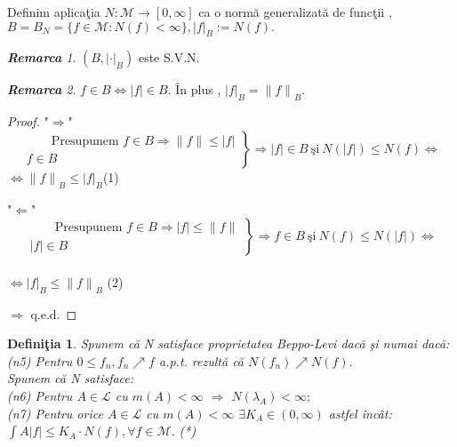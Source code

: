 \documentclass[ a4paper, 12pt]{report}
\newtheorem{definition}{\bf Defini\c tia}[section]
\theoremstyle{remark}
\newtheorem{remarc}{\bf Remarca}[section]
\numberwithin{equation}{section}
\begin{document}
Definim aplica\c tia $N : \mathcal{M} \rightarrow [0,\infty]$ ca o norm\u a generalizat\u a de func\c tii ,\\ $B=B_N=\{f \in \mathcal{M} : N(f) < \infty\} , {\lvert f \rvert}_B := N(f).$
\begin{remarc}
$(B,{\lvert \cdot \rvert}_B)$ este S.V.N.
\end{remarc}
\begin{remarc}
$f \in B \Leftrightarrow \lvert f \rvert \in B.$ \^In plus , ${\lvert f \rvert}_B = {\lVert f \rVert}_B.$
\end{remarc}
\begin{proof}
"$\Rightarrow$"
\begin{equation*}
\left.\begin{aligned}
          \qquad\text{Presupunem $f \in B$} \Rightarrow {\lVert f \rVert} \leq \lvert f \rvert\\
         f \in B
       \end{aligned}
\right\}
\Rightarrow \lvert f \rvert \in B \ \mbox{\c si}\  N(\lvert f \rvert) \leq N(f) \Leftrightarrow
\end{equation*}
$\Leftrightarrow {\lVert f \rVert}_B \leq {\lvert f \rvert}_B$\hspace{2mm}(1)

"$\Leftarrow$"
\begin{equation*}
\left.\begin{aligned}
          \qquad\text{Presupunem $f \in B$} \Rightarrow {\lvert f \rvert} \leq \lVert f \rVert\\
         \lvert f \rvert \in B
       \end{aligned}
\right\}
\Rightarrow f \in B \ \mbox{\c si}\  N(f) \leq N(\lvert f \rvert)\Leftrightarrow
\end{equation*}
\\
$\Leftrightarrow {\lvert f \rvert}_B \leq {\lVert f \rVert}_B$ (2)

$\Rightarrow$ q.e.d.
\end{proof}
\begin{definition}
Spunem c\u a N satisface proprietatea Beppo-Levi dac\u a \c si numai dac\u a:\\
(n5) Pentru $0 \leq f_n ,  f_n \nearrow f$ a.p.t. rezult\u a c\u a  $N(f_n) \nearrow N(f).$\\
Spunem c\u a N satisface:\\
(n6) Pentru $A \in \mathcal{L}$ cu $m(A)<\infty$ $\Rightarrow$ $N(\lambda_A)<\infty;$\\
(n7) Pentru orice $A \in \mathcal{L}$ cu $m(A)<\infty$    $\exists  K_A \in (0,\infty)$ astfel \^inc\^at:\\
$\int\limits{A}{} \lvert f \rvert \leq K_A \cdot N(f),\forall f \in \mathcal{M}.$ \hspace{3mm}(*)
\end{definition}
\end{document}
